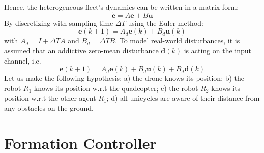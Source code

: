 \documentclass{ifacconf}
\begin{document}
Hence, the heterogeneous fleet's dynamics can be written in a matrix form:
\begin{equation}
    \dot{\boldsymbol{e}} = A \boldsymbol{e} + B \boldsymbol{u}
\end{equation}
By discretizing with sampling time $\Delta T$ using the Euler method:
\begin{equation}
    \boldsymbol{e}(k+1) = A_d \boldsymbol{e}(k) + B_d \boldsymbol{u}(k) 
    \label{eq:airground-fleet-z}
\end{equation}
with $A_d = I + \Delta T A $ and $B_d = \Delta T B$.
To model real-world disturbances, it is assumed 
that an addictive zero-mean disturbance $\boldsymbol{d}(k)$
is acting on the input channel, i.e.
\begin{equation}
    \boldsymbol{e}(k+1) = A_d \boldsymbol{e}(k) + B_d \boldsymbol{u}(k) + B_d \boldsymbol{d}(k)
    \label{eq:airground-fleet-z}
\end{equation}
Let us make the following hypothesis: 
a) the drone knows its position;
b) the robot $R_1$ knows its position w.r.t the quadcopter;
c) the robot $R_2$ knows its position w.r.t the other agent $R_1$;
d) all unicycles are aware of their distance from any obstacles on the ground.
\section{Formation Controller}
\label{sec:formation_controller}
\end{document}
